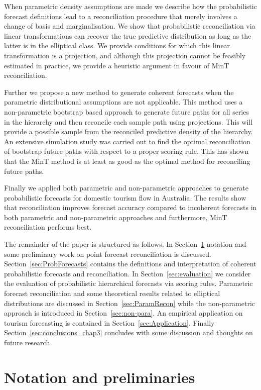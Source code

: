 \documentclass[12pt]{article}
\theoremstyle{definition}
\begin{document}
When parametric density assumptions are made we describe how the probabilistic forecast definitions lead to a reconciliation procedure that merely involves a change of basis and marginalisation. We show that probabilistic reconciliation via linear transformations can recover the true predictive distribution as long as the latter is in the elliptical class. We provide conditions for which this linear transformation is a projection, and although this projection cannot be feasibly estimated in practice, we provide a heuristic argument in favour of MinT reconciliation.

Further we propose a new method to generate coherent forecasts when the parametric distributional assumptions are not applicable. This method uses a non-parametric bootstrap based approach to generate future paths for all series in the hierarchy and then reconcile each sample path using projections. This will provide a possible sample from the reconciled predictive density of the hierarchy. An extensive simulation study was carried out to find the optimal reconciliation of bootstrap future paths with respect to a proper scoring rule. This has shown that the MinT method is at least as good as the optimal method for reconciling future paths.

Finally we applied both parametric and non-parametric approaches to generate probabilistic forecasts for domestic tourism flow in Australia. The results show that reconciliation improves forecast accuracy compared to incoherent forecasts in both parametric and non-parametric approaches and furthermore, MinT reconciliation performs best.

The remainder of the paper is structured as follows. In Section~\ref{sec:Notat&Prelim} notation and some preliminary work on point forecast reconciliation is discussed. Section~\ref{sec:ProbForecasts} contains the definitions and interpretation of coherent probabilistic forecasts and reconciliation. In Section~\ref{sec:evaluation} we consider the evaluation of probabilistic hierarchical forecasts via scoring rules. Parametric forecast reconciliation and some theoretical results related to elliptical distributions are discussed in Section~\ref{sec:ParamRecon} while the non-parametric approach is introduced in Section~\ref{sec:non-para}. An empirical application on tourism forecasting is contained in Section~\ref{sec:Application}. Finally Section~\ref{sec:conclusions_chap3} concludes with some discussion and thoughts on future research.


\section{Notation and preliminaries}\label{sec:Notat&Prelim}
\end{document}
